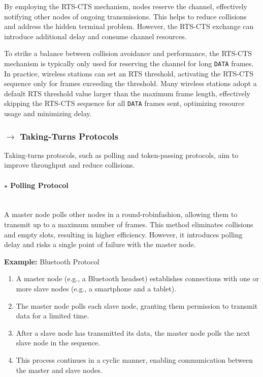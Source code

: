 \noindent By employing the RTS-CTS mechanism, nodes reserve the channel, effectively notifying other nodes of ongoing transmissions. This helps to reduce collisions and address the hidden terminal problem. However, the RTS-CTS exchange can introduce additional delay and consume channel resources.

To strike a balance between collision avoidance and performance, the RTS-CTS mechanism is typically only used for reserving the channel for long \texttt{DATA} frames. In practice, wireless stations can set an RTS threshold, activating the RTS-CTS sequence only for frames exceeding the threshold. Many wireless stations adopt a default RTS threshold value larger than the maximum frame length, effectively skipping the RTS-CTS sequence for all \texttt{DATA} frames sent, optimizing resource usage and minimizing delay.

\clearpage
\subsubsection[5.3.3 Taking-Turns Protocols]{$\rightarrow$ Taking-Turns Protocols}
\label{subsec:turn-access-protocols}

Taking-turns protocols, such as polling and token-passing protocols, aim to improve throughput and reduce collisions.

\paragraph[5.3.3.1 Polling Protocol]{$\pmb{\star}$ Polling Protocol}\mbox{}\\[4pt]
A master node polls other nodes in a round-robin\footnotemark[5] fashion, allowing them to transmit up to a maximum number of frames. This method eliminates collisions and empty slots, resulting in higher efficiency. However, it introduces polling delay and risks a single point of failure with the master node.

\vspace{1em}
\noindent \textbf{Example:} Bluetooth Protocol
\begin{enumerate}
    \item A master node (e.g., a Bluetooth headset) establishes connections with one or more slave nodes (e.g., a smartphone and a tablet).
    \item The master node polls each slave node, granting them permission to transmit data for a limited time.
    \item After a slave node has transmitted its data, the master node polls the next slave node in the sequence.
    \item This process continues in a cyclic manner, enabling communication between the master and slave nodes.
\end{enumerate}

